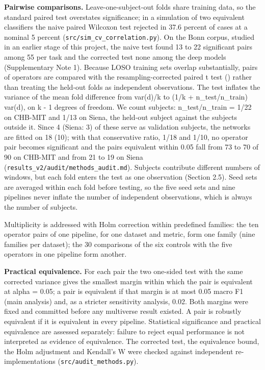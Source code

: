 \documentclass[11pt,a4paper]{article}
\newcounter{none} %
\begin{document}
\textbf{Pairwise comparisons.} Leave-one-subject-out folds share training data, so the
standard paired test overstates significance; in a simulation of two equivalent
classifiers the naive paired Wilcoxon test rejected in 37.6 percent of cases at a
nominal 5 percent (\nolinkurl{src/sim_cv_correlation.py}). On the Bonn corpus, studied in an
earlier stage of this project, the naive test found 13 to 22 significant pairs among
55 per task and the corrected test none among the deep models (Supplementary Note 1).
Because LOSO training sets overlap substantially, pairs of operators are compared with
the resampling-corrected paired t test (\citealp{Nadeau_2003}) rather than treating
the held-out folds as independent observations. The test inflates the variance of the
mean fold difference from var(d)/k to (1/k + n\_test/n\_train) var(d), on k - 1 degrees
of freedom. We count subjects: n\_test/n\_train = 1/22 on CHB-MIT and 1/13 on Siena, the
held-out subject against the subjects outside it. Since 4 (Siena: 3) of these serve as
validation subjects, the networks are fitted on 18 (10); with that conservative ratio,
1/18 and 1/10, no operator pair becomes significant and the pairs equivalent within
0.05 fall from 73 to 70 of 90 on CHB-MIT and from 21 to 19 on Siena
(\nolinkurl{results_v2/audit/methods_audit.md}). Subjects contribute different numbers of
windows, but each fold enters the test as one observation (Section 2.5). Seed sets are
averaged within each fold before testing, so the five seed sets and nine pipelines
never inflate the number of independent observations, which is always the number of
subjects.

Multiplicity is addressed with Holm correction within predefined families: the ten
operator pairs of one pipeline, for one dataset and metric, form one family (nine
families per dataset); the 30 comparisons of the six controls with the five operators
in one pipeline form another.

\textbf{Practical equivalence.} For each pair the two one-sided test with the same
corrected variance gives the smallest margin within which the pair is equivalent at
alpha = 0.05; a pair is equivalent if that margin is at most 0.05 macro F1 (main
analysis) and, as a stricter sensitivity analysis, 0.02. Both margins were fixed and
committed before any multiverse result existed. A pair is robustly equivalent if it is
equivalent in every pipeline. Statistical significance and practical equivalence are
assessed separately: failure to reject equal performance is not interpreted as
evidence of equivalence. The corrected test, the equivalence bound, the Holm
adjustment and Kendall's W were checked against independent re-implementations
(\nolinkurl{src/audit_methods.py}).
\end{document}
